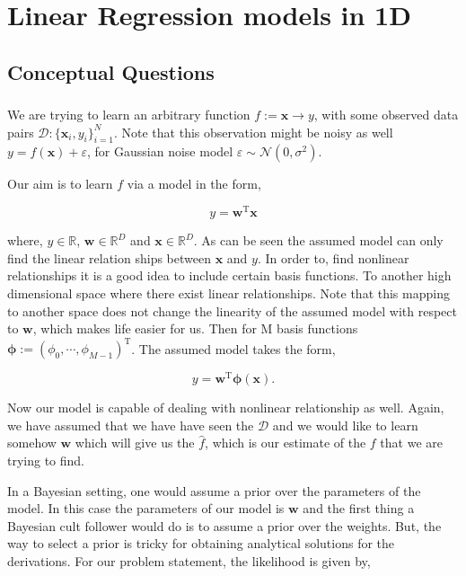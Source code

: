 \documentclass{article}
\begin{document}
\section{Linear Regression models in 1D}

\subsection{Conceptual Questions}

\subsubsection{}


We are trying to learn an arbitrary function $f:=\mathbf{x} \to y$, with some observed data pairs $\mathcal{D}:\{\mathbf{x}_i, y_i\}_{i=1}^{N}$. Note that this observation might be noisy as well $y=f(\mathbf{x})+\varepsilon$, for Gaussian noise model $\varepsilon\sim\mathcal{N}(0,\sigma^2)$.

Our aim is to learn $f$ via a model in the form,

\begin{equation}
y = \mathbf{w}^\text{T}\mathbf{x}
\end{equation}

where, $y\in\mathbb{R}$, $\mathbf{w}\in\mathbb{R}^D$ and $\mathbf{x}\in\mathbb{R}^D$. As can be seen the assumed model can only find the linear relation ships between $\mathbf{x}$ and $y$. In order to, find nonlinear relationships it is a good idea to include certain basis functions. To another high dimensional space where there exist linear relationships. Note that this mapping to another space does not change the linearity of the assumed model with respect to $\mathbf{w}$, which makes life easier for us. Then for M basis functions $\boldsymbol{\phi}:=(\phi_0, \cdots, \phi_{M-1})^\text{T}$. The assumed model takes the form,

\begin{equation}
  y = \mathbf{w}^\text{T}\boldsymbol{\phi}(\mathbf{x}).
\end{equation}

Now our model is capable of dealing with nonlinear relationship as well. Again, we have assumed that we have have seen the $\mathcal{D}$ and we would like to learn somehow $\mathbf{w}$ which will give us the $\hat{f}$, which is our estimate of the $f$ that we are trying to find.

In a Bayesian setting, one would assume a prior over the parameters of the model. In this case the parameters of our model is $\mathbf{w}$ and the first thing a Bayesian cult follower would do is to assume a prior over the weights. But, the way to select a prior is tricky for obtaining analytical solutions for the derivations. For our problem statement, the likelihood is given by,
\end{document}
